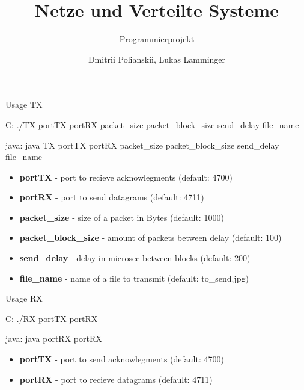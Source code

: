 \documentclass[10pt]{beamer}
\title{Netze und Verteilte Systeme}
\subtitle{Programmierprojekt}
\date{}
\author{Dmitrii Polianskii, Lukas Lamminger}
\institute{Universit\"at Salzburg}
\begin{document}
\maketitle




\begin{frame}[fragile]{Usage TX}
	\begin{block}{C:}
		\hspace*{2mm} \footnotesize 	 ./TX portTX portRX packet\_size packet\_block\_size send\_delay file\_name
	\end{block}

	\begin{block}{java:}
		\hspace*{2mm} \footnotesize 	 java TX portTX portRX packet\_size packet\_block\_size send\_delay file\_name
	\end{block}
		
  \begin{itemize}
  	\footnotesize 	
    \item{\textbf{portTX}} - port to recieve acknowlegments (default: 4700)
    \item{\textbf{portRX}} - port to send datagrams (default: 4711)
    \item{\textbf{packet\_size}} - size of a packet in Bytes (default: 1000)
    \item{\textbf{packet\_block\_size}} - amount of packets between delay (default: 100)
    \item{\textbf{send\_delay}} - delay in microsec between blocks (default: 200)
    \item{\textbf{file\_name}} - name of a file to transmit (default: to\_send.jpg)
  \end{itemize}
\end{frame}

\begin{frame}[fragile]{Usage RX}
	\begin{block}{C:}
		\hspace*{2mm} \footnotesize ./RX portTX portRX 
	\end{block}

	\begin{block}{java:}
		\hspace*{2mm} \footnotesize java portRX portRX 
	\end{block}
		
  \begin{itemize}
  	\footnotesize 	
    \item{\textbf{portTX}} - port to send acknowlegments (default: 4700)
    \item{\textbf{portRX}} - port to recieve datagrams (default: 4711)
  \end{itemize}
\end{frame}
\end{document}
